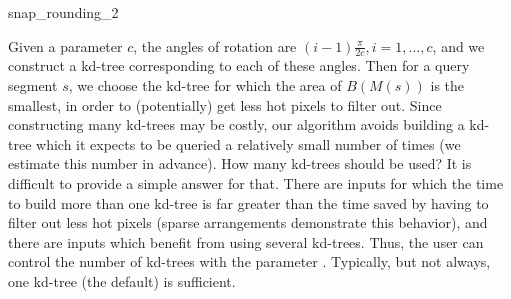 \begin{ccRefFunction}{snap_rounding_2}
\begin{ccAdvanced}
 Given a parameter $c$, the angles of rotation are $(i - 1)
 \frac{\pi}{2c}, i=1,\ldots,c$, and we construct a kd-tree
 corresponding to each of these angles. Then for a query segment $s$,
 we choose the kd-tree for which the area of $B(M(s))$ is the smallest,
 in order to (potentially) get less hot pixels to filter out.  Since
 constructing many kd-trees may be costly, our algorithm avoids
 building a kd-tree which it expects to be queried a relatively small
 number of times (we estimate this number in advance).  How many
 kd-trees should be used?  It is difficult to provide a simple
 answer for that.  There are inputs for which the time to build more
 than one kd-tree is far greater than the time saved by having to
 filter out less hot pixels (sparse arrangements demonstrate this
 behavior), and there are inputs which benefit from using several
 kd-trees. Thus, the user can control the number of kd-trees
 with the parameter . Typically, but not
 always, one kd-tree (the default) is sufficient.

\end{ccAdvanced}

\end{ccRefFunction}


